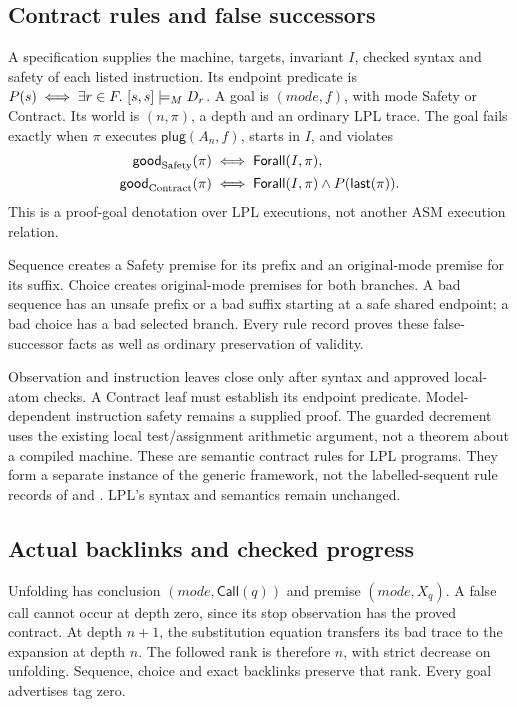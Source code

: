 \subsection{Contract rules and false successors}
A specification supplies the machine, targets, invariant $I$, checked
syntax and safety of each listed instruction. Its endpoint predicate is
$P(s)\iff\exists r\in F.\ [s,s]\sat_M D_r$.
A goal is $(\mathit{mode},f)$, with mode Safety or Contract. Its world is
$(n,\pi)$, a depth and an ordinary LPL trace. The goal fails exactly when
$\pi$ executes $\mathsf{plug}(A_n,f)$, starts in $I$, and violates
\begin{align*}
 \mathsf{good}_{\rm Safety}(\pi)&\iff\mathsf{Forall}(I,\pi),\\
 \mathsf{good}_{\rm Contract}(\pi)&\iff
      \mathsf{Forall}(I,\pi)\land P(\mathsf{last}(\pi)).
\end{align*}
This is a proof-goal denotation over LPL executions, not another ASM
execution relation.

Sequence creates a Safety premise for its prefix and an original-mode
premise for its suffix. Choice creates original-mode premises for both
branches. A bad sequence has an unsafe prefix or a bad suffix starting
at a safe shared endpoint; a bad choice has a bad selected branch.
Every rule record proves these false-successor facts as well as ordinary
preservation of validity.

Observation and instruction leaves close only after syntax and approved
local-atom checks. A Contract leaf must establish its endpoint predicate.
Model-dependent instruction safety remains a supplied proof. The guarded
decrement uses the existing local test/assignment arithmetic argument,
not a theorem about a compiled machine.
These are semantic contract rules for LPL programs. They form a separate
instance of the generic framework, not the labelled-sequent rule records
of  and . LPL's syntax and semantics remain
unchanged.

\subsection{Actual backlinks and checked progress}
Unfolding has conclusion $(\mathit{mode},\mathsf{Call}(q))$ and premise
$(\mathit{mode},X_q)$. A false call cannot occur at depth zero, since its
stop observation has the proved contract. At depth $n+1$, the substitution
equation transfers its bad trace to the expansion at depth $n$.
The followed rank is therefore $n$, with strict decrease on unfolding.
Sequence, choice and exact backlinks preserve that rank. Every goal
advertises tag zero.


